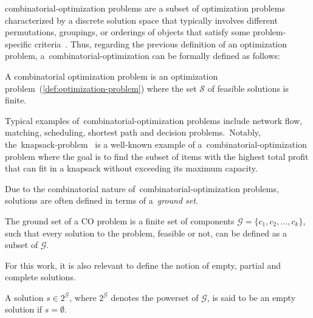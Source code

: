 \acrfull{combinatorial-optimization} problems are a subset of optimization
problems characterized by a discrete solution space that typically involves
different permutations, groupings, or orderings of objects that satisfy some
problem-specific
criteria~\cite{papadimitriou1998combinatorial,vieira2009uma,blum2003metaheuristics,yu2010combinatorial}.
Thus, regarding the previous definition of an optimization problem,
a~\acrshort{combinatorial-optimization} can be formally defined as follows:

\begin{definition}
  \label{def:combinatorial-optimization-problem}
  A combinatorial optimization problem is an optimization
  problem~(\ref{def:optimization-problem}) where the set $\mathcal{S}$ of
  feasible solutions is finite.
\end{definition}

Typical examples of~\acrshort{combinatorial-optimization} problems include
network flow, matching, scheduling, shortest path and decision problems.~Notably,
the~\acrfull{knapsack-problem}~\cite{cacchiani2022knapsack,
  yu2010combinatorial,festa2014brief} is a well-known example of
a~\acrshort{combinatorial-optimization} problem where the goal is to find the
subset of items with the highest total profit that can fit in a knapsack without
exceeding its maximum capacity.

Due to the combinatorial nature of~\acrshort{combinatorial-optimization}
problems, solutions are often defined in terms of a~\emph{ground set}.

\begin{definition}
  The ground set of a CO problem is a finite set of
  components $\mathcal{G} = \{c_1, c_2, \ldots, c_k\}$, such that every solution to the
  problem, feasible or not, can be defined as a subset of $\mathcal{G}$.
\end{definition}

For this work, it is also relevant to define the notion of empty, partial and
complete solutions.

\begin{definition}
  \label{def:empty-solution}
  A solution $s \in 2^\mathcal{G}$, where $2^\mathcal{G}$ denotes the powerset of $\mathcal{G}$,
  is said to be an empty solution if $s = \emptyset$.
\end{definition}

